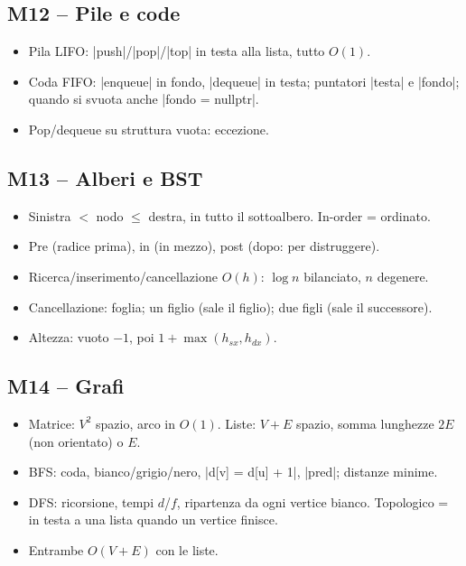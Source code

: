 \subsection*{M12 -- Pile e code}
\begin{itemize}
  \item Pila LIFO: \cc|push|/\cc|pop|/\cc|top| in testa alla lista, tutto $O(1)$.
  \item Coda FIFO: \cc|enqueue| in fondo, \cc|dequeue| in testa; puntatori \cc|testa| e
        \cc|fondo|; quando si svuota anche \cc|fondo = nullptr|.
  \item Pop/dequeue su struttura vuota: eccezione.
\end{itemize}

\subsection*{M13 -- Alberi e BST}
\begin{itemize}
  \item Sinistra $<$ nodo $\le$ destra, in tutto il sottoalbero. In-order = ordinato.
  \item Pre (radice prima), in (in mezzo), post (dopo: per distruggere).
  \item Ricerca/inserimento/cancellazione $O(h)$: $\log n$ bilanciato, $n$ degenere.
  \item Cancellazione: foglia; un figlio (sale il figlio); due figli (sale il successore).
  \item Altezza: vuoto $-1$, poi $1 + \max(h_{sx}, h_{dx})$.
\end{itemize}

\subsection*{M14 -- Grafi}
\begin{itemize}
  \item Matrice: $V^2$ spazio, arco in $O(1)$. Liste: $V + E$ spazio, somma lunghezze $2E$
        (non orientato) o $E$.
  \item BFS: coda, bianco/grigio/nero, \cc|d[v] = d[u] + 1|, \cc|pred|; distanze minime.
  \item DFS: ricorsione, tempi $d$/$f$, ripartenza da ogni vertice bianco.
        Topologico = in testa a una lista quando un vertice finisce.
  \item Entrambe $O(V + E)$ con le liste.
\end{itemize}

